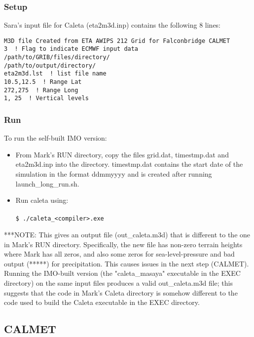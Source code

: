 \documentclass[10pt,a4paper]{article}
\newcommand\tab[1][0.5cm]{\hspace*{#1}}
\begin{document}
\subsubsection{Setup}
Sara's input file for Caleta (eta2m3d.inp) contains the following 8 lines:
\begin{lstlisting}
M3D file Created from ETA AWIPS 212 Grid for Falconbridge CALMET 
3  ! Flag to indicate ECMWF input data
/path/to/GRIB/files/directory/
/path/to/output/directory/
eta2m3d.lst  ! list file name
10.5,12.5  ! Range Lat
272,275  ! Range Long
1, 25  ! Vertical levels
\end{lstlisting}

\subsubsection{Run}
To run the self-built IMO version:
\begin{itemize}
\item From Mark's RUN directory, copy the files grid.dat, timestmp.dat and eta2m3d.inp into the directory. timestmp.dat contains the start date of the simulation in the format ddmmyyyy and is created after running launch\_long\_run.sh. 
\item Run caleta using:\\\\
\tab \texttt{\$ ./caleta\_<compiler>.exe}
\end{itemize}
***NOTE: This gives an output file (out\_caleta.m3d) that is different to the one in Mark's RUN directory. Specifically, the new file has non-zero terrain heights where Mark has all zeros, and also some zeros for sea-level-pressure and bad output (*****) for precipitation. This causes issues in the next step (CALMET). Running the IMO-built version (the "caleta\_masaya" executable in the EXEC directory) on the same input files produces a valid out\_caleta.m3d file; this suggests that the code in Mark's Caleta directory is somehow different to the code used to build the Caleta executable in the EXEC directory.

\subsection{CALMET}
\end{document}
